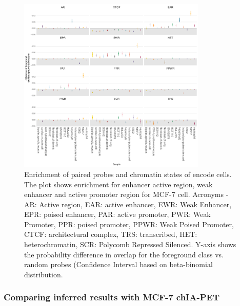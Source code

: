 \begin{figure}
\centering
\includegraphics[width=0.8\textwidth]{images/funcivar.pdf}
\caption[Enrichment of paired probes and chromatin states of encode cells]{\label{fig:funcivar} Enrichment of paired probes and chromatin states of encode cells. The plot shows enrichment for enhancer active region, weak enhancer and active promoter region for MCF-7 cell. Acronyms - AR: Active region, EAR: active enhancer,
 EWR: Weak Enhancer, EPR: poised enhancer, PAR: active promoter, PWR: Weak Promoter,
 PPR: poised promoter, PPWR: Weak Poised Promoter, CTCF: architectural complex,
 TRS: transcribed, HET: heterochromatin, SCR: Polycomb Repressed Silenced. Y-axis shows the probability difference in overlap for the foreground class vs. random probes (Confidence Interval based on beta-binomial distribution.}
\end{figure}



\subsubsection*{Comparing inferred results with MCF-7 chIA-PET}

